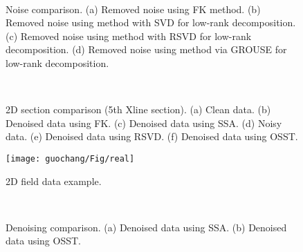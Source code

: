 \begin{figure}[htb!]
  \centering
    \\ 
   \caption{Noise comparison. (a) Removed noise using FK method. (b) Removed noise using  method with SVD for low-rank decomposition. (c) Removed noise using  method with RSVD for low-rank decomposition. (d) Removed noise using  method via GROUSE for low-rank decomposition.}
   \label{fig:syn3d-n-fk,syn3d-n-mssa,syn3d-n-rsvd,syn3d-n-mc}
\end{figure}

\begin{figure}[htb!]
  \centering
    \\ 
   \caption{2D section comparison (5th Xline section). (a) Clean data. (b) Denoised data using FK. (c) Denoised data using SSA. (d) Noisy data. (e) Denoised data using RSVD. (f) Denoised data using OSST.}
   \label{fig:syn3d-c-s,syn3d-fk-s,syn3d-ssa-s,syn3d-n-s,syn3d-rsvd-s,syn3d-mc-s}
\end{figure}

\begin{figure}[htb!]
  \centering
  \texttt{[image: guochang/Fig/real]}          
   \caption{2D field data example.}
   \label{fig:real}
\end{figure}

\begin{figure}[htb!]
  \centering
  \\
   \caption{Denoising comparison. (a) Denoised data using SSA. (b) Denoised data using OSST. }
   \label{fig:real-dn}
\end{figure}

